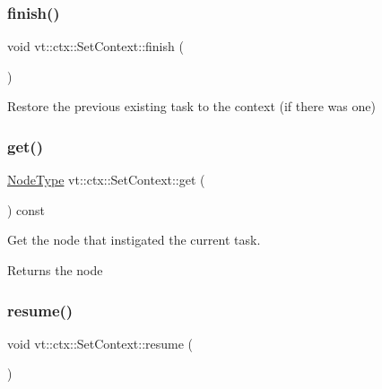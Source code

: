 \subsubsection{\texorpdfstring{finish()}{finish()}}
{\footnotesize\ttfamily void vt\+::ctx\+::\+Set\+Context\+::finish (\begin{DoxyParamCaption}{ }\end{DoxyParamCaption})}



Restore the previous existing task to the context (if there was one) 

\mbox{\label{structvt_1_1ctx_1_1_set_context_ab809e42e05e4ee549fbecc6962307d77}} 
\subsubsection{\texorpdfstring{get()}{get()}}
{\footnotesize\ttfamily \hyperlink{namespacevt_a866da9d0efc19c0a1ce79e9e492f47e2}{Node\+Type} vt\+::ctx\+::\+Set\+Context\+::get (\begin{DoxyParamCaption}{ }\end{DoxyParamCaption}) const\hspace{0.3cm}{\ttfamily [inline]}}



Get the node that instigated the current task. 

\begin{DoxyReturn}{Returns}
the node 
\end{DoxyReturn}
\mbox{\label{structvt_1_1ctx_1_1_set_context_ab9cfd26c1453f6ab9ae5d9b3463676e0}} 
\subsubsection{\texorpdfstring{resume()}{resume()}}
{\footnotesize\ttfamily void vt\+::ctx\+::\+Set\+Context\+::resume (\begin{DoxyParamCaption}{ }\end{DoxyParamCaption})}

\mbox{\label{structvt_1_1ctx_1_1_set_context_a271e2a9370869f1ca9539bf496760b31}} 
